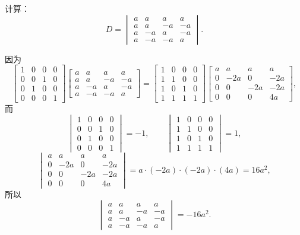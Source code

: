 \begin{example}
计算：\[
	D = \begin{vmatrix}
		a & a & a & a \\
		a & a & -a & -a \\
		a & -a & a & -a \\
		a & -a & -a & a
	\end{vmatrix}.
\]
\begin{solution}
因为\[
	\begin{bmatrix}
		1 & 0 & 0 & 0 \\
		0 & 0 & 1 & 0 \\
		0 & 1 & 0 & 0 \\
		0 & 0 & 0 & 1
	\end{bmatrix} \begin{bmatrix}
		a & a & a & a \\
		a & a & -a & -a \\
		a & -a & a & -a \\
		a & -a & -a & a
	\end{bmatrix}
	= \begin{bmatrix}
		1 & 0 & 0 & 0 \\
		1 & 1 & 0 & 0 \\
		1 & 0 & 1 & 0 \\
		1 & 1 & 1 & 1
	\end{bmatrix} \begin{bmatrix}
		a & a & a & a \\
		0 & -2 a & 0 & -2 a \\
		0 & 0 & -2 a & -2 a \\
		0 & 0 & 0 & 4 a
	\end{bmatrix},
\]而\[
	\begin{vmatrix}
		1 & 0 & 0 & 0 \\
		0 & 0 & 1 & 0 \\
		0 & 1 & 0 & 0 \\
		0 & 0 & 0 & 1
	\end{vmatrix} = -1,
	\qquad
	\begin{vmatrix}
		1 & 0 & 0 & 0 \\
		1 & 1 & 0 & 0 \\
		1 & 0 & 1 & 0 \\
		1 & 1 & 1 & 1
	\end{vmatrix} = 1,
\]\[
	\begin{vmatrix}
		a & a & a & a \\
		0 & -2 a & 0 & -2 a \\
		0 & 0 & -2 a & -2 a \\
		0 & 0 & 0 & 4 a
	\end{vmatrix}
	= a\cdot(-2a)\cdot(-2a)\cdot(4a) = 16a^2,
\]
所以\[
	\begin{vmatrix}
		a & a & a & a \\
		a & a & -a & -a \\
		a & -a & a & -a \\
		a & -a & -a & a
	\end{vmatrix}
	= -16a^2.
\]
\end{solution}
\end{example}


